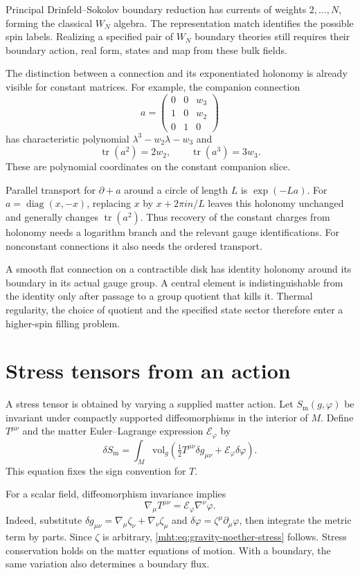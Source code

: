 Principal Drinfeld--Sokolov boundary reduction has currents of
weights $2,\ldots,N$, forming the classical $W_N$ algebra.
The representation match identifies the possible spin labels.
Realizing a specified pair of $W_N$ boundary theories still requires
their boundary action, real form, states and map from these bulk
fields.

The distinction between a connection and its exponentiated holonomy
is already visible for constant matrices.
For example, the companion connection
\[
 a=\begin{pmatrix}0&0&w_3\\1&0&w_2\\0&1&0\end{pmatrix}
\]
has characteristic polynomial $\lambda^3-w_2\lambda-w_3$ and
\[
 \operatorname{tr}(a^2)=2w_2,
 \qquad \operatorname{tr}(a^3)=3w_3.
\]
These are polynomial coordinates on the constant companion slice.

Parallel transport for $\partial+a$ around a circle of length $L$
is $\exp(-La)$.
For $a=\operatorname{diag}(x,-x)$, replacing $x$ by
$x+2\pi i n/L$ leaves this holonomy unchanged and generally
changes $\operatorname{tr}(a^2)$.
Thus recovery of the constant charges from holonomy needs a
logarithm branch and the relevant gauge identifications.
For nonconstant connections it also needs the ordered transport.

A smooth flat connection on a contractible disk has identity
holonomy around its boundary in its actual gauge group.
A central element is indistinguishable from the identity only
after passage to a group quotient that kills it.
Thermal regularity, the choice of quotient and the specified
state sector therefore enter a higher-spin filling problem.

\section{Stress tensors from an action}

A stress tensor is obtained by varying a supplied matter action.
Let $S_{\mathrm m}(g,\varphi)$ be invariant under compactly supported
diffeomorphisms in the interior of $M$.
Define $T^{\mu\nu}$ and the matter Euler--Lagrange expression
$\mathcal E_\varphi$ by
\[
 \delta S_{\mathrm m}
 =\int_M\mathrm{vol}_g
   \left(\tfrac12T^{\mu\nu}\delta g_{\mu\nu}
                  +\mathcal E_\varphi\delta\varphi\right).
\]
This equation fixes the sign convention for $T$.

For a scalar field, diffeomorphism invariance implies
\begin{equation}\label{mht:eq:gravity-noether-stress}
 \nabla_\mu T^{\mu\nu}=\mathcal E_\varphi\nabla^\nu\varphi.
\end{equation}
Indeed, substitute
$\delta g_{\mu\nu}=\nabla_\mu\zeta_\nu+\nabla_\nu\zeta_\mu$
and $\delta\varphi=\zeta^\mu\partial_\mu\varphi$, then integrate
the metric term by parts. Since $\zeta$ is arbitrary,
\eqref{mht:eq:gravity-noether-stress} follows.
Stress conservation holds on the matter equations of motion.
With a boundary, the same variation also determines a boundary flux.

